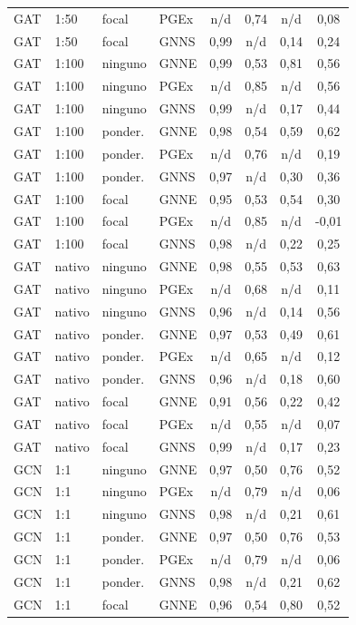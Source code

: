 \begin{longtable}{llll cccc}
GAT & 1:50 & focal & PGEx & n/d & 0,74 & n/d & 0,08 \\
GAT & 1:50 & focal & GNNS & 0,99 & n/d & 0,14 & 0,24 \\
GAT & 1:100 & ninguno & GNNE & 0,99 & 0,53 & 0,81 & 0,56 \\
GAT & 1:100 & ninguno & PGEx & n/d & 0,85 & n/d & 0,56 \\
GAT & 1:100 & ninguno & GNNS & 0,99 & n/d & 0,17 & 0,44 \\
GAT & 1:100 & ponder. & GNNE & 0,98 & 0,54 & 0,59 & 0,62 \\
GAT & 1:100 & ponder. & PGEx & n/d & 0,76 & n/d & 0,19 \\
GAT & 1:100 & ponder. & GNNS & 0,97 & n/d & 0,30 & 0,36 \\
GAT & 1:100 & focal & GNNE & 0,95 & 0,53 & 0,54 & 0,30 \\
GAT & 1:100 & focal & PGEx & n/d & 0,85 & n/d & -0,01 \\
GAT & 1:100 & focal & GNNS & 0,98 & n/d & 0,22 & 0,25 \\
GAT & nativo & ninguno & GNNE & 0,98 & 0,55 & 0,53 & 0,63 \\
GAT & nativo & ninguno & PGEx & n/d & 0,68 & n/d & 0,11 \\
GAT & nativo & ninguno & GNNS & 0,96 & n/d & 0,14 & 0,56 \\
GAT & nativo & ponder. & GNNE & 0,97 & 0,53 & 0,49 & 0,61 \\
GAT & nativo & ponder. & PGEx & n/d & 0,65 & n/d & 0,12 \\
GAT & nativo & ponder. & GNNS & 0,96 & n/d & 0,18 & 0,60 \\
GAT & nativo & focal & GNNE & 0,91 & 0,56 & 0,22 & 0,42 \\
GAT & nativo & focal & PGEx & n/d & 0,55 & n/d & 0,07 \\
GAT & nativo & focal & GNNS & 0,99 & n/d & 0,17 & 0,23 \\
GCN & 1:1 & ninguno & GNNE & 0,97 & 0,50 & 0,76 & 0,52 \\
GCN & 1:1 & ninguno & PGEx & n/d & 0,79 & n/d & 0,06 \\
GCN & 1:1 & ninguno & GNNS & 0,98 & n/d & 0,21 & 0,61 \\
GCN & 1:1 & ponder. & GNNE & 0,97 & 0,50 & 0,76 & 0,53 \\
GCN & 1:1 & ponder. & PGEx & n/d & 0,79 & n/d & 0,06 \\
GCN & 1:1 & ponder. & GNNS & 0,98 & n/d & 0,21 & 0,62 \\
GCN & 1:1 & focal & GNNE & 0,96 & 0,54 & 0,80 & 0,52 \\

\end{longtable}
